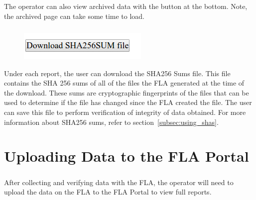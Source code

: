 \documentclass[11pt, oneside]{book}
\begin{document}
\paragraph{  }
The operator can also view archived data with the button at the bottom. Note, the archived page can take some time to load.
\paragraph{  }
\begin{figure}
\centering
\includegraphics[width=1\linewidth]{../media/fla_preview_screenshots/download_sha_button}
\end{figure}
Under each report, the user can download the SHA256 Sums file.
This file contains the SHA 256 sums of all of the files the FLA generated at the time of the download. These sums are cryptographic fingerprints of the files that can be used to determine if the file has changed since the FLA created the file. The user can save this file to perform verification of integrity of data obtained. For more information about SHA256 sums, refer to section~\ref{subsec:using_shas}.

\chapter{Uploading Data to the FLA Portal}
\paragraph{  }
After collecting and verifying data with the FLA, the operator will need to upload the data on the FLA to the FLA Portal to view full reports.
\end{document}
